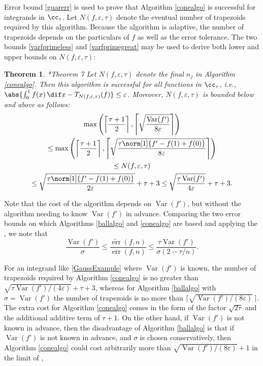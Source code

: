 \documentclass[]{article}
\DeclareMathOperator{\Var}{Var}
\DeclareMathOperator{\err}{err}
\newcommand{\oerr}{\overline{\err}}
\newcommand{\terr}{\widetilde{\err}}
\newtheorem{theorem}{Theorem}
\theoremstyle{definition}
\theoremstyle{remark}
\begin{document}
Error bound \eqref{guarerr} is used to prove that Algorithm \ref{conealgo} is successful for integrands in $\cc_{\tau}$.  Let $N(f,\varepsilon,\tau)$ denote the eventual number of trapezoids required by this algorithm.  Because the algorithm is adaptive, the number of trapezoids depends on the particulars of $f$ as well as the error tolerance.  The two bounds \eqref{varfprimeless} and \eqref{varfprimegreat} may be used to derive both lower and upper bounds on $N(f,\varepsilon,\tau)$:

\begin{theorem}\cite{HicEtal14b}*{Theorem 7} \label{conealgothm}
Let $N(f,\varepsilon,\tau)$ denote the final $n_j$ in Algorithm \ref{conealgo}.  Then this algorithm is successful for all functions in $\cc_{\tau}$,  i.e.,  $\abs{\int_0^1 f(x) \, \dif x - T_{N(f,\varepsilon,\tau)}(f)} \le \varepsilon$.  Moreover, $N(f,\varepsilon,\tau)$ is bounded below and above as follows:
\begin{multline}
\max \left(\left \lceil\frac{\tau+1}{2} \right \rceil, \left \lceil \sqrt{\frac{ \Var(f')}{8\varepsilon}} \right \rceil \right) \\
\le \max \left(\left \lceil\frac{\tau+1}{2} \right \rceil, \left \lceil \sqrt{\frac{\tau \norm[1]{f'-f(1)+f(0)}}{8\varepsilon}} \right \rceil \right) \\
\le
N(f,\varepsilon,\tau) \\
\le \sqrt{\frac{\tau \norm[1]{f'-f(1)+f(0)}}{2\varepsilon}} + \tau + 3
\le \sqrt{\frac{\tau \Var(f') }{4\varepsilon}} + \tau + 3.
\end{multline}
\end{theorem}

Note that the cost of the algorithm depends on $\Var(f')$, but without the algorithm needing to know $\Var(f')$ in advance.   Comparing the two error bounds on which Algorithms \ref{ballalgo} and \ref{conealgo} are based and applying the , we note that 
\begin{equation*}
\frac{\Var(f')}{\sigma} \le
\frac{\terr(f,n)}{\oerr(f,n)}
\le \frac{\tau\Var(f')}{\sigma (2-\tau/n)}.
\end{equation*}



For an integrand like \eqref{GaussExample} where $\Var(f')$ is known, the number of trapezoids required by Algorithm \ref{conealgo} is no greater than  $\sqrt{\tau \Var(f') /(4\varepsilon)} + \tau + 3$, whereas for Algorithm \ref{ballalgo} with $\sigma=\Var(f')$ the number of trapezoids is no more than $\bigl \lceil \sqrt{\Var(f') /(8\varepsilon)} \, \bigr\rceil$.  The extra cost for Algorithm \ref{conealgo} comes in the form of the factor $\sqrt{2\tau}$ and the additional additive term of $\tau+1$.  On the other hand, if $\Var(f')$ is not known in advance, then the disadvantage of Algorithm  \ref{ballalgo} is that if $\Var(f')$ is not known in advance, and $\sigma$ is chosen conservatively, then Algorithm \ref{conealgo} could cost arbitrarily more than $\sqrt{\Var(f') /(8\varepsilon)}+1$ in the limit of , 
\end{document}
